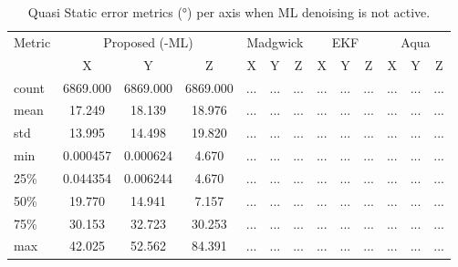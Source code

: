 \documentclass{iutbscthesis}
\begin{document}
\begin{table}[H]
\centering
\caption{Quasi Static error metrics (°) per axis when ML denoising is not active.}
\label{tab:quasi_no_ml}
\begin{tabular}{l
  *{4}{ccc}
}
\toprule
Metric & \multicolumn{3}{c}{Proposed (-ML)} & \multicolumn{3}{c}{Madgwick} & \multicolumn{3}{c}{EKF} & \multicolumn{3}{c}{Aqua} \\
 & X & Y & Z & X & Y & Z & X & Y & Z & X & Y & Z \\
\midrule
count & 6869.000 & 6869.000 & 6869.000 & ... & ... & ... & ... & ... & ... & ... & ... & ... \\
mean & 17.249 & 18.139 & 18.976 & ... & ... & ... & ... & ... & ... & ... & ... & ... \\
std & 13.995 & 14.498 & 19.820 & ... & ... & ... & ... & ... & ... & ... & ... & ... \\
min & 0.000457 & 0.000624 & 4.670 & ... & ... & ... & ... & ... & ... & ... & ... & ... \\
25\% & 0.044354 & 0.006244 & 4.670 & ... & ... & ... & ... & ... & ... & ... & ... & ... \\
50\% & 19.770 & 14.941 & 7.157 & ... & ... & ... & ... & ... & ... & ... & ... & ... \\
75\% & 30.153 & 32.723 & 30.253 & ... & ... & ... & ... & ... & ... & ... & ... & ... \\
max & 42.025 & 52.562 & 84.391 & ... & ... & ... & ... & ... & ... & ... & ... & ... \\
\bottomrule
\end{tabular}
\end{table}
\end{document}
